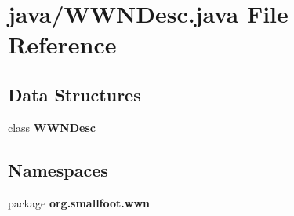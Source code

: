 \section{java/\-W\-W\-N\-Desc.java \-File \-Reference}
\label{WWNDesc_8java}
\subsection*{\-Data \-Structures}
\begin{DoxyCompactItemize}
\item 
class {\bf \-W\-W\-N\-Desc}
\end{DoxyCompactItemize}
\subsection*{\-Namespaces}
\begin{DoxyCompactItemize}
\item 
package {\bf org.\-smallfoot.\-wwn}
\end{DoxyCompactItemize}
